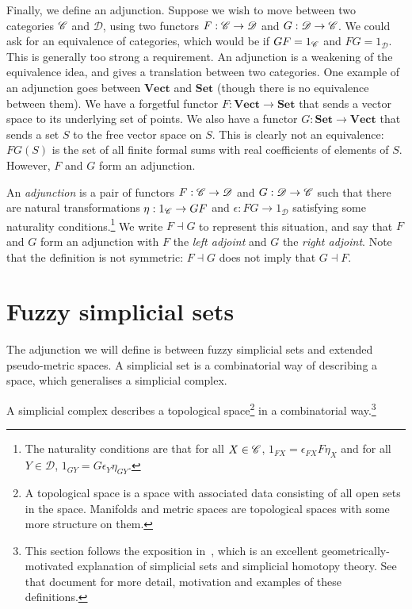 \documentclass[a4paper,11pt,leqno]{article} \usepackage{amsmath}
\newcommand{\curD}{\mathscr{D}} \newcommand{\curI}{\mathscr{I}}
\theoremstyle{definition} \newtheorem{defn}{Definition}
\begin{document}
Finally, we define an adjunction.  Suppose we wish to move between two
categories $\mathscr{C}$ and $\curD$, using two functors $F: \curC\to\curD$ and $G:
\curD\to\curC$.  We could ask for an equivalence of categories, which would be
if $GF = 1_{\mathscr{C}}$ and $FG = 1_{\curD}$.  This is generally too strong
a requirement.  An adjunction is a weakening of the equivalence idea, and gives
a translation between two categories.  One example of an adjunction goes between
$\textbf{Vect}$ and $\textbf{Set}$ (though there is no equivalence between
them).  We have a forgetful functor $F: \textbf{Vect}\to \textbf{Set}$ that
sends a vector space to its underlying set of points.  We also have a functor
$G: \textbf{Set}\to \textbf{Vect}$ that sends a set $S$ to the free vector space
on $S$.  This is clearly not an equivalence: $FG(S)$ is the set of all finite
formal sums with real coefficients of elements of $S$.  However, $F$ and $G$
form an adjunction.

An \emph{adjunction} is a pair of functors $F: \curC\to\curD$ and $G:
\curD\to\curC$ such that there are natural transformations $\eta: 1_{\mathscr{C}}\to GF$
and $\epsilon: FG\to 1_\curD$ satisfying some naturality conditions.\footnote{
  The naturality conditions are that for all $X\in\mathscr{C}$, $1_{FX}
  = \epsilon_{FX}F\eta_X$ and for all $Y\in\curD$, $1_{GY}
  = G\epsilon_Y\eta_{GY}$.} We write $F\dashv G$ to represent this situation,
and say that $F$ and $G$ form an adjunction with $F$ the \emph{left adjoint} and
$G$ the \emph{right adjoint}.  Note that the definition is not symmetric:
$F\dashv G$ does not imply that $G\dashv F$.

\section{Fuzzy simplicial sets}

The adjunction we will define is between fuzzy simplicial sets and extended
pseudo-metric spaces. A simplicial set is a combinatorial way of describing
a space, which generalises a simplicial complex.

A simplicial complex describes a topological space\footnote{ A topological space
is a space with associated data consisting of all open sets in the space.
Manifolds and metric spaces are topological spaces with some more structure on
them.} in a combinatorial way.\footnote{ This section follows the exposition
in~\cite{Friedman08}, which is an excellent geometrically-motivated explanation
of simplicial sets and simplicial homotopy theory. See that document for more
detail, motivation and examples of these definitions.}
\end{document}
